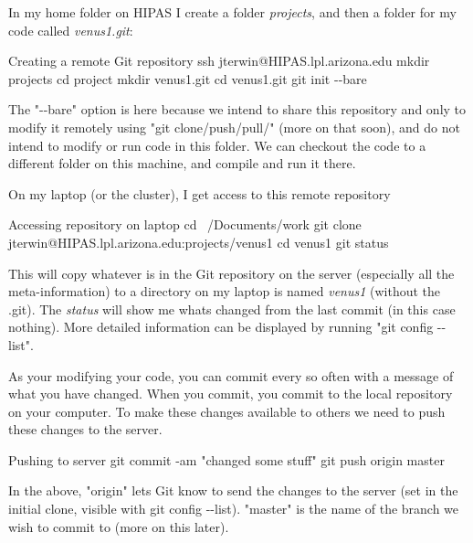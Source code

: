 \documentclass{beamer}
\begin{document}
\begin{frame}
In my home folder on HIPAS I create a folder \textit{projects}, and then a folder for my code called \textit{venus1.git}:
\begin{block}{Creating a remote Git repository}
ssh jterwin@HIPAS.lpl.arizona.edu \newline
mkdir projects \newline
cd project \newline
mkdir venus1.git \newline
cd venus1.git \newline
git init -{}-bare
\end{block}
The "-{}-bare" option is here because we intend to share this repository and only to modify it remotely using "git clone/push/pull/" (more on that soon), and do not intend to modify or run code in this folder. We can checkout the code to a different folder on this machine, and compile and run it there.
\end{frame}


\begin{frame}
On my laptop (or the cluster), I get access to this remote repository
\begin{block}{Accessing repository on laptop}
cd ~/Documents/work \newline
git clone jterwin@HIPAS.lpl.arizona.edu:projects/venus1 \newline
cd venus1 \newline
git status
\end{block}
This will copy whatever is in the Git repository on the server (especially all the meta-information) to a directory on my laptop is named \textit{venus1} (without the .git). The \textit{status} will show me whats changed from the last commit (in this case nothing). More detailed information can be displayed by running "git config -{}-list".
\end{frame}


\begin{frame}
As your modifying your code, you can commit every so often with a message of what you have changed. When you commit, you commit to the \alert{local} repository on your computer. To make these changes available to others we need to push these changes to the \alert{server}.
\begin{block}{Pushing to server}
git commit -am "changed some stuff" \newline
git push origin master
\end{block}
In the above, "origin" lets Git know to send the changes to the server (set in the initial clone, visible with git config -{}-list). "master" is the name of the branch we wish to commit to (more on this later).
\end{frame}
\end{document}
